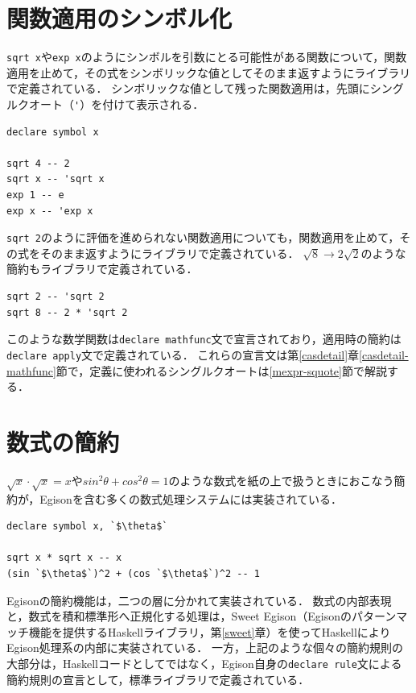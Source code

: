 \section{関数適用のシンボル化}\label{cas-symbol2}

\lstinline{sqrt x}や\lstinline{exp x}のようにシンボルを引数にとる可能性がある関数について，関数適用を止めて，その式をシンボリックな値としてそのまま返すようにライブラリで定義されている．
シンボリックな値として残った関数適用は，先頭にシングルクオート（\lstinline{'}）を付けて表示される．
\begin{lstlisting}[language=egison,numbers=none]
declare symbol x

sqrt 4 -- 2
sqrt x -- 'sqrt x
exp 1 -- e
exp x -- 'exp x
\end{lstlisting}

\lstinline{sqrt 2}のように評価を進められない関数適用についても，関数適用を止めて，その式をそのまま返すようにライブラリで定義されている．
$\sqrt{8} \rightarrow 2 \sqrt{2}$のような簡約もライブラリで定義されている．
\begin{lstlisting}[language=egison,numbers=none]
sqrt 2 -- 'sqrt 2
sqrt 8 -- 2 * 'sqrt 2
\end{lstlisting}
このような数学関数は\lstinline{declare mathfunc}文で宣言されており，適用時の簡約は\lstinline{declare apply}文で定義されている．
これらの宣言文は第\ref{casdetail}章\ref{casdetail-mathfunc}節で，定義に使われるシングルクオートは\ref{mexpr-squote}節で解説する．


\section{数式の簡約}\label{cas-simplify}

$\sqrt{x} \cdot \sqrt{x} = x$や$sin^2\theta + cos^2\theta = 1$のような数式を紙の上で扱うときにおこなう簡約が，Egisonを含む多くの数式処理システムには実装されている．
\begin{lstlisting}[language=egison,numbers=none]
declare symbol x, `$\theta$`

sqrt x * sqrt x -- x
(sin `$\theta$`)^2 + (cos `$\theta$`)^2 -- 1
\end{lstlisting}
Egisonの簡約機能は，二つの層に分かれて実装されている．
数式の内部表現と，数式を積和標準形へ正規化する処理は，Sweet Egison（Egisonのパターンマッチ機能を提供するHaskellライブラリ，第\ref{sweet}章）を使ってHaskellによりEgison処理系の内部に実装されている．
一方，上記のような個々の簡約規則の大部分は，Haskellコードとしてではなく，Egison自身の\lstinline{declare rule}文による簡約規則の宣言として，標準ライブラリで定義されている．

